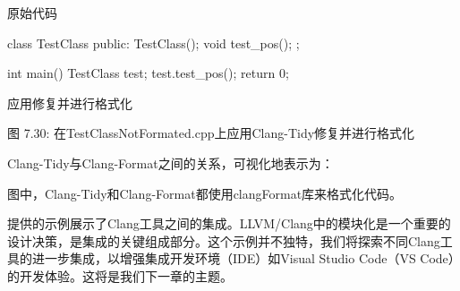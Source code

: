 原始代码

\begin{cpp}
class TestClass {
public:
  TestClass(){};
  void test_pos(){};
};

int main() {
  TestClass test;
  test.test_pos();
  return 0;
}
\end{cpp}

应用修复并进行格式化

\begin{center}
图 7.30: 在TestClassNotFormated.cpp上应用Clang-Tidy修复并进行格式化
\end{center}

Clang-Tidy与Clang-Format之间的关系，可视化地表示为：


图中，Clang-Tidy和Clang-Format都使用clangFormat库来格式化代码。

提供的示例展示了Clang工具之间的集成。LLVM/Clang中的模块化是一个重要的设计决策，是集成的关键组成部分。这个示例并不独特，我们将探索不同Clang工具的进一步集成，以增强集成开发环境（IDE）如Visual Studio Code（VS Code）的开发体验。这将是我们下一章的主题。












































































